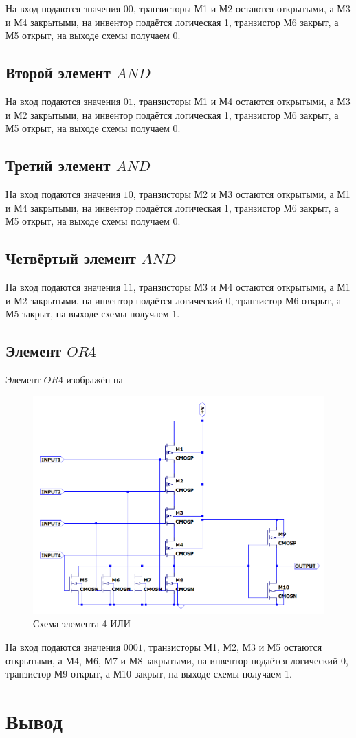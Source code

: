 \documentclass[a4paper,14pt]{article}
\begin{document}
	На вход подаются значения $00$, транзисторы М1 и М2 остаются открытыми, а М3 и М4 закрытыми, на инвентор подаётся логическая 1, транзистор М6 закрыт, а М5 открыт, на выходе схемы получаем 0.

	\subsection{Второй элемент $AND$}

	На вход подаются значения $01$, транзисторы М1 и М4 остаются открытыми, а М3 и М2 закрытыми, на инвентор подаётся логическая 1, транзистор М6 закрыт, а М5 открыт, на выходе схемы получаем 0.
	
	\subsection{Третий элемент $AND$}
	
	На вход подаются значения $10$, транзисторы М2 и М3 остаются открытыми, а М1 и М4 закрытыми, на инвентор подаётся логическая 1, транзистор М6 закрыт, а М5 открыт, на выходе схемы получаем 0.

	\subsection{Четвёртый элемент $AND$}

	На вход подаются значения $11$, транзисторы М3 и М4 остаются открытыми, а М1 и М2 закрытыми, на инвентор подаётся логический 0, транзистор М6 открыт, а М5 закрыт, на выходе схемы получаем 1.
	
	\subsection{Элемент $OR4$}
	
	Элемент $OR4$ изображён на 
	
	\begin{figure}[H]
		\centering		
		\includegraphics[width=\linewidth]{image/schema_or}
		\caption{Схема элемента 4-ИЛИ}\label{img:schema_or}
	\end{figure}

	На вход подаются значения $0001$, транзисторы М1, М2, М3 и М5 остаются открытыми, а М4, М6, М7 и М8	 закрытыми, на инвентор подаётся логический 0, транзистор М9 открыт, а М10 закрыт, на выходе схемы получаем 1.
	
\section{Вывод}
\end{document}
